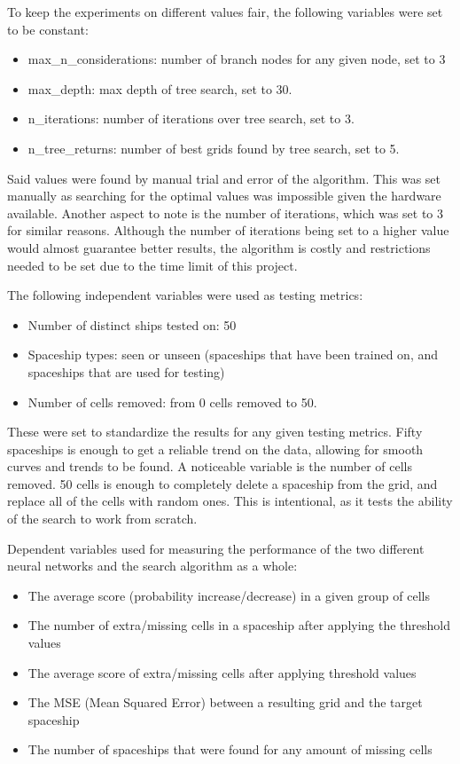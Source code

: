 \documentclass{l4proj}
\begin{document}
To keep the experiments on different values fair, the following variables were set to be constant:
\begin{itemize}
    \item max\_n\_considerations: number of branch nodes for any given node, set to 3
    \item max\_depth: max depth of tree search, set to 30.
    \item n\_iterations: number of iterations over tree search, set to 3.
    \item n\_tree\_returns: number of best grids found by tree search, set to 5.
\end{itemize}

Said values were found by manual trial and error of the algorithm. This was set manually as searching for the optimal values was impossible given the hardware available. Another aspect to note is the number of iterations, which was set to 3 for similar reasons. Although the number of iterations being set to a higher value would almost guarantee better results, the algorithm is costly and restrictions needed to be set due to the time limit of this project.

The following independent variables were used as testing metrics:
\begin{itemize}
    \item Number of distinct ships tested on: 50
    \item Spaceship types: seen or unseen (spaceships that have been trained on, and spaceships that are used for testing)
    \item Number of cells removed: from 0 cells removed to 50.
\end{itemize}

These were set to standardize the results for any given testing metrics. Fifty spaceships is enough to get a reliable trend on the data, allowing for smooth curves and trends to be found. A noticeable variable is the number of cells removed. 50 cells is enough to completely delete a spaceship from the grid, and replace all of the cells with random ones. This is intentional, as it tests the ability of the search to work from scratch.

Dependent variables used for measuring the performance of the two different neural networks and the search algorithm as a whole:
\begin{itemize}
    \item The average score (probability increase/decrease) in a given group of cells
    \item The number of extra/missing cells in a spaceship after applying the threshold values 
    \item The average score of extra/missing cells after applying threshold values
    \item The MSE (Mean Squared Error) between a resulting grid and the target spaceship 
    \item The number of spaceships that were found for any amount of missing cells
\end{itemize}
\end{document}
